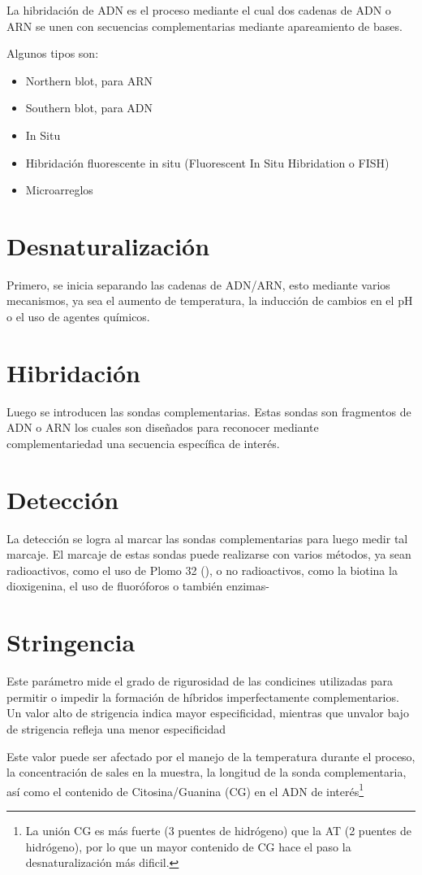 
La hibridación de ADN es el proceso mediante el cual dos cadenas de ADN o ARN se unen con secuencias complementarias mediante apareamiento de bases.

Algunos tipos son:

\begin{itemize}
    \item Northern blot, para ARN
    \item Southern blot, para ADN
    \item In Situ
    \item Hibridación fluorescente in situ (Fluorescent In Situ Hibridation o FISH)
    \item Microarreglos
\end{itemize}

\section{Desnaturalización}

Primero, se inicia separando las cadenas de ADN/ARN, esto mediante varios mecanismos, ya sea el aumento de temperatura, la inducción de cambios  en el pH o el uso de agentes químicos.

\section{Hibridación}

Luego se introducen las sondas complementarias. Estas sondas son fragmentos de ADN o ARN los cuales son diseñados para reconocer mediante complementariedad una secuencia específica de interés.

\section{Detección}

La detección se logra al marcar las sondas complementarias para luego medir tal marcaje. El marcaje de estas sondas puede realizarse con varios métodos, ya sean radioactivos, como el uso de Plomo 32 (), o no radioactivos, como la biotina la dioxigenina, el uso de fluoróforos o también enzimas-

\section{Stringencia}

Este parámetro mide el grado de rigurosidad de las condicines utilizadas para permitir o impedir la formación de híbridos imperfectamente complementarios. Un valor alto de strigencia indica mayor especificidad, mientras que unvalor bajo de strigencia refleja una menor especificidad

Este valor puede ser afectado por el manejo de la temperatura durante el proceso, la concentración de sales en la muestra, la longitud de la sonda complementaria, así como el contenido de Citosina/Guanina (CG) en el ADN de interés\footnote{La unión CG es más fuerte (3 puentes de hidrógeno) que la AT (2 puentes de hidrógeno), por lo que un mayor contenido de CG hace el paso la desnaturalización más dificil.}